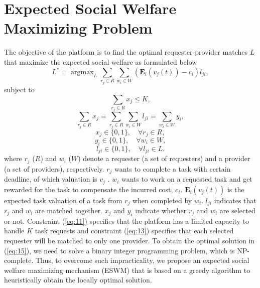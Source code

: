 \documentclass[letterpaper]{article} %
\DeclareMathOperator*{\argmax}{argmax}
\begin{document}
	\section{Expected Social Welfare Maximizing Problem}
	\label{part:3}
	The objective of the platform is to find the optimal requester-provider matches \small$L$ \normalsize that maximize the expected social welfare as formulated below 
	\small
	\begin{equation}
	\label{eq:15}
	L^*=\argmax_{L} \sum_{r_j \in R}\sum_{w_i \in W} (\mathbf{E}_i(v_j(t)) - c_i) l_{ji},  
	\end{equation}\normalsize
	subject to 
	\small\begin{equation}
	\tag{11.a}
	\label{eq:11}
	\sum_{r_j \in R} x_j \leq K,
	\end{equation}
	\begin{equation}
	\tag{11.b}
	\label{eq:13}
	\sum_{r_j \in R} x_j = \sum_{r_j \in R}\sum_{w_i \in W} l_{ji} = \sum_{w_i \in W} y_i,
	\end{equation}
	\begin{equation}
	\tag{11.c}
	\label{eq:12}
	x_j \in \{0, 1\},\quad \forall r_j \in R,
	\end{equation}
	\begin{equation}
	\tag{11.d}
	\label{eq:14}
	y_i \in \{0, 1\},\quad \forall w_i \in W,
	\end{equation}
	\begin{equation}
	\tag{11.e}
	\label{eq:16}
	l_{ji} \in \{0, 1\},\quad \forall l_{ji} \in L.
	\end{equation}\normalsize
	where \small$r_j$ ($R$) \normalsize and \small$w_i$ ($W$) \normalsize denote a requester (a set of requesters) and a provider (a set of providers), respectively. \small$r_j$ \normalsize wants to complete a task with certain deadline, of which valuation is \small$v_j$ \normalsize. \small$w_i$ \normalsize wants to work on a requested task and get rewarded for the task to compensate the incurred cost, \small$c_i$\normalsize. \small$\mathbf{E}_i(v_j(t))$ \normalsize is the expected task valuation of a task from \small$r_j$ \normalsize when completed by \small$w_i$\normalsize. \small$l_{ji}$ \normalsize indicates that \small$r_j$ \normalsize and \small$w_i$ \normalsize are matched together. $x_j$ and $y_i$ indicate whether $r_j$ and $w_i$ are selected or not. 	
	Constraint (\ref{eq:11}) specifies that the platform has a limited capacity to handle \small$K$ \normalsize task requests and constraint (\ref{eq:13}) specifies that each selected requester will be matched to only one provider. To obtain the optimal solution in (\ref{eq:15}), we need to solve a binary integer programming problem, which is NP-complete. 
	Thus, to overcome such impracticality, we propose an expected social welfare maximizing mechanism (ESWM) that is based on a greedy algorithm to heuristically obtain the locally optimal solution.     
	
\end{document}
